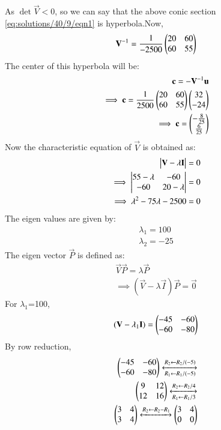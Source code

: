 As $\det{\vec{V}}<0$, so we can say that the above conic section \ref{eq:solutions/40/9/eqn1} is hyperbola.Now,
\begin{align}
\mathbf{V}^{-1} =\frac{1}{-2500} \begin{pmatrix}20 & 60\\60 & 55\end{pmatrix}
\end{align}
The center of this hyperbola will be:
\begin{align}
\mathbf{c} = - \mathbf{V}^{-1} \mathbf{u}\\
\implies \mathbf{c} = \frac{1}{2500} \begin{pmatrix}20 & 60\\60 & 55\end{pmatrix} \begin{pmatrix}32 \\ -24\end{pmatrix}\\
\implies \mathbf{c} = \begin{pmatrix}-\frac{8}{25} \\ \frac{6}{25}\end{pmatrix}\\
\end{align}
 Now the characteristic equation of $\vec{V}$ is obtained as:
\begin{align}
\begin{vmatrix}\mathbf{V} - \lambda\mathbf{I}\end{vmatrix} =0\\
\implies \begin{vmatrix}55-\lambda & -60\\-60 & 20-\lambda\end{vmatrix} = 0\\
\implies \lambda^2 - 75\lambda - 2500=0
\end{align}
The eigen values are given by:
\begin{align}
\lambda_1=100\\
\lambda_2 = -25
\end{align}
The eigen vector $\vec{P}$ is defined as:
\begin{align}
\vec{V}\vec{P} = \lambda \vec{P}\\
\implies (\vec{V} -\lambda\vec{I})\vec{P} = \vec{0}
\end{align}
For $\lambda_1$=100,
\begin{align}
(\mathbf{V} -\lambda_1\mathbf{I}) = \begin{pmatrix}-45 & -60\\-60 & -80\end{pmatrix}
\end{align}
By row reduction,
\begin{align}
\begin{pmatrix}-45 & -60\\-60 & -80\end{pmatrix}\xleftrightarrow[R_1\leftarrow R_1 /(-5)]{R_2\leftarrow R_2/(-5)}\\
\begin{pmatrix}9 & 12\\12 & 16\end{pmatrix}\xleftrightarrow[R_1\leftarrow R_1 /3]{R_2\leftarrow R_2/4}\\
\begin{pmatrix}3 & 4\\3 & 4\end{pmatrix}\xleftrightarrow[]{R_2\leftarrow R_2-R_1}\begin{pmatrix}3 & 4\\0 & 0\end{pmatrix}
\end{align}
